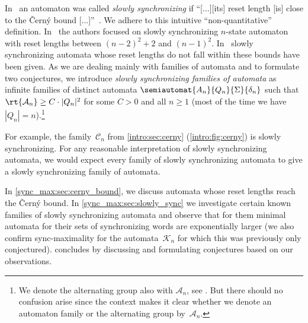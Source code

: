 	
In~\cite{DBLP:conf/mfcs/AnanichevGV10,KisielewiczS15} an automaton
was called \emph{slowly synchronizing}
if ``[...][its] reset length [is] close to 
the \v{C}ern\'y bound [...]''~\cite{DBLP:conf/mfcs/AnanichevGV10}. 
We adhere to this intuitive ``non-quantitative'' definition.
In~\cite{AnaVolGus2013}
the authors focused on slowly synchronizing $n$-state automaton with reset
lengths between $(n-2)^2 + 2$ and $(n-1)^2$.
In~\cite{Martugin08,DBLP:journals/jalc/Volkov19a}
slowly synchronizing automata whose reset lengths
do not fall within these bounds have been given.
As we are dealing mainly with families of automata
and to formulate two conjectures, %
we introduce \emph{slowly synchronizing families of automata}
as infinite families of distinct automata $\semiautomat{A_n}{Q_n}{\Sigma}{\delta_n}$ 	
such that $\rt{\mathcal A_n} \ge C\cdot |Q_n|^2$
for some $C > 0$ and all $n \ge 1$ (most of the time we have $|Q_n| = n$).\footnote{We denote
the alternating group also with $\mathcal A_n$, see \pageref{def:A_n}.
But there should no confusion arise since the context makes it clear whether
we denote an automaton family or the alternating group by~$\mathcal A_n$.} 

For example, the \Cerny family~$\mathcal C_n$ from 
\cref{intro:sec:cerny} (\cref{intro:fig:cerny})
is slowly synchronizing.
For any reasonable interpretation of slowly synchronizing automata,
we would expect every family of slowly synchronizing automata
to give a slowly synchronizing family of automata.

In \cref{sync_max:sec:cerny_bound}, 
we discuss automata whose reset lengths reach 
the \v{C}ern\'y bound. In \cref{sync_max:sec:slowly_sync}
we investigate certain known families of slowly synchronizing automata
and observe that for them
minimal automata for their sets of synchronizing words are exponentially larger (we also confirm
sync-maximality for the automata~$\mathcal K_n$ for which this was previously only conjectured).
 concludes by discussing and formulating conjectures based
on our observations.

